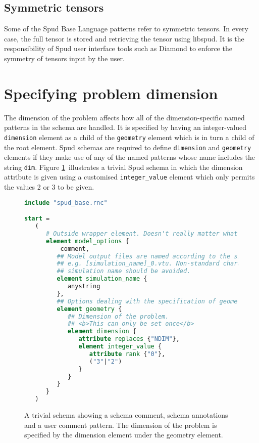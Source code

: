 \documentclass[a4paper, 11pt]{book}
\begin{document}
\subsection{Symmetric tensors}

Some of the Spud Base Language patterns refer to symmetric tensors. In every
case, the full tensor is stored and retrieving the tensor using libspud. It
is the responsibility of Spud user interface tools such as Diamond to
enforce the symmetry of tensors input by the user.

\section{Specifying problem dimension }

The dimension of the problem affects how all of the dimension-specific named
patterns in the schema are handled. It is specified by having an
integer-valued \lstinline+dimension+ element as a child of the
\lstinline+geometry+ element which is in turn a child of the root
element. Spud schemas are required to define \lstinline+dimension+ and
\lstinline+geometry+ elements if they make use of any of the
named patterns whose name includes the string \verb+dim+. Figure
\ref{fig:schema}\ illustrates a trivial Spud schema in which the dimension
attribute is given using a customised \lstinline+integer_value+ element
which only permits the values 2 or 3 to be given.

\begin{figure}[t]
\begin{lstlisting}[language=rnc,frame=trBL]
include "spud_base.rnc"

start = 
   (
      # Outside wrapper element. Doesn't really matter what the name is.
      element model_options {
          comment,
         ## Model output files are named according to the simulation name, 
         ## e.g. [simulation_name]_0.vtu. Non-standard characters in the 
         ## simulation name should be avoided.
         element simulation_name {
            anystring
         },
         ## Options dealing with the specification of geometry
         element geometry {
            ## Dimension of the problem.
            ## <b>This can only be set once</b>
            element dimension {
               attribute replaces {"NDIM"},
               element integer_value {
                  attribute rank {"0"},
                  ("3"|"2")
               }
            }
         }
      }
   )  
\end{lstlisting}

  \caption{A trivial schema showing a schema comment, schema annotations and
  a user comment pattern. The dimension of the problem is specified by the
  dimension element under the geometry element.}
  \label{fig:schema}

\end{figure}
\end{document}
